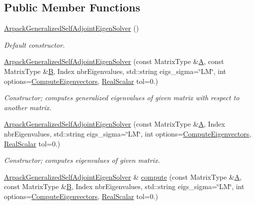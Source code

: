 \subsection*{Public Member Functions}
\begin{DoxyCompactItemize}
\item 
\hyperlink{class_eigen_1_1_arpack_generalized_self_adjoint_eigen_solver_aab45c05af4937baddb38e26bffe80a42}{Arpack\+Generalized\+Self\+Adjoint\+Eigen\+Solver} ()
\begin{DoxyCompactList}\small\item\em Default constructor. \end{DoxyCompactList}\item 
\hyperlink{class_eigen_1_1_arpack_generalized_self_adjoint_eigen_solver_ab67d6c5218fd84e74fc03d55acd0c89e}{Arpack\+Generalized\+Self\+Adjoint\+Eigen\+Solver} (const Matrix\+Type \&\hyperlink{group___core___module_class_eigen_1_1_matrix}{A}, const Matrix\+Type \&\hyperlink{group___core___module_class_eigen_1_1_matrix}{B}, Index nbr\+Eigenvalues, std\+::string eigs\+\_\+sigma=\char`\"{}LM\char`\"{}, int options=\hyperlink{group__enums_ggae3e239fb70022eb8747994cf5d68b4a9ada93d8885bde32b876ba4af01d3292cc}{Compute\+Eigenvectors}, \hyperlink{class_eigen_1_1_arpack_generalized_self_adjoint_eigen_solver_a2555af55e53bf9de894a49e639be2e1e}{Real\+Scalar} tol=0.)
\begin{DoxyCompactList}\small\item\em Constructor; computes generalized eigenvalues of given matrix with respect to another matrix. \end{DoxyCompactList}\item 
\hyperlink{class_eigen_1_1_arpack_generalized_self_adjoint_eigen_solver_a896d444b17b59c3b061800f579317a73}{Arpack\+Generalized\+Self\+Adjoint\+Eigen\+Solver} (const Matrix\+Type \&\hyperlink{group___core___module_class_eigen_1_1_matrix}{A}, Index nbr\+Eigenvalues, std\+::string eigs\+\_\+sigma=\char`\"{}LM\char`\"{}, int options=\hyperlink{group__enums_ggae3e239fb70022eb8747994cf5d68b4a9ada93d8885bde32b876ba4af01d3292cc}{Compute\+Eigenvectors}, \hyperlink{class_eigen_1_1_arpack_generalized_self_adjoint_eigen_solver_a2555af55e53bf9de894a49e639be2e1e}{Real\+Scalar} tol=0.)
\begin{DoxyCompactList}\small\item\em Constructor; computes eigenvalues of given matrix. \end{DoxyCompactList}\item 
\hyperlink{class_eigen_1_1_arpack_generalized_self_adjoint_eigen_solver}{Arpack\+Generalized\+Self\+Adjoint\+Eigen\+Solver} \& \hyperlink{class_eigen_1_1_arpack_generalized_self_adjoint_eigen_solver_a1a905e5e65e82e559a2cc394a9f42385}{compute} (const Matrix\+Type \&\hyperlink{group___core___module_class_eigen_1_1_matrix}{A}, const Matrix\+Type \&\hyperlink{group___core___module_class_eigen_1_1_matrix}{B}, Index nbr\+Eigenvalues, std\+::string eigs\+\_\+sigma=\char`\"{}LM\char`\"{}, int options=\hyperlink{group__enums_ggae3e239fb70022eb8747994cf5d68b4a9ada93d8885bde32b876ba4af01d3292cc}{Compute\+Eigenvectors}, \hyperlink{class_eigen_1_1_arpack_generalized_self_adjoint_eigen_solver_a2555af55e53bf9de894a49e639be2e1e}{Real\+Scalar} tol=0.)

\end{DoxyCompactItemize}
